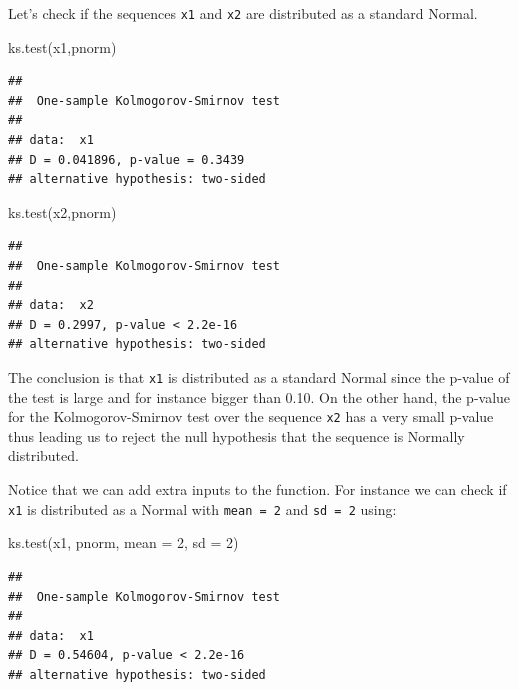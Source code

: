\documentclass[
]{book}
\newenvironment{Shaded}{\begin{snugshade}}{\end{snugshade}}
\newcommand{\AttributeTok}[1]{\textcolor[rgb]{0.77,0.63,0.00}{#1}}
\newcommand{\DecValTok}[1]{\textcolor[rgb]{0.00,0.00,0.81}{#1}}
\newcommand{\FunctionTok}[1]{\textcolor[rgb]{0.00,0.00,0.00}{#1}}
\newcommand{\NormalTok}[1]{#1}
\theoremstyle{definition}
\theoremstyle{definition}
\theoremstyle{definition}
\theoremstyle{definition}
\theoremstyle{remark}
\begin{document}
Let's check if the sequences \texttt{x1} and \texttt{x2} are distributed as a standard Normal.

\begin{Shaded}
\begin{Highlighting}[]
\FunctionTok{ks.test}\NormalTok{(x1,pnorm)}
\end{Highlighting}
\end{Shaded}

\begin{verbatim}
## 
##  One-sample Kolmogorov-Smirnov test
## 
## data:  x1
## D = 0.041896, p-value = 0.3439
## alternative hypothesis: two-sided
\end{verbatim}

\begin{Shaded}
\begin{Highlighting}[]
\FunctionTok{ks.test}\NormalTok{(x2,pnorm)}
\end{Highlighting}
\end{Shaded}

\begin{verbatim}
## 
##  One-sample Kolmogorov-Smirnov test
## 
## data:  x2
## D = 0.2997, p-value < 2.2e-16
## alternative hypothesis: two-sided
\end{verbatim}

The conclusion is that \texttt{x1} is distributed as a standard Normal since the p-value of the test is large and for instance bigger than 0.10. On the other hand, the p-value for the Kolmogorov-Smirnov test over the sequence \texttt{x2} has a very small p-value thus leading us to reject the null hypothesis that the sequence is Normally distributed.

Notice that we can add extra inputs to the function. For instance we can check if \texttt{x1} is distributed as a Normal with \texttt{mean\ =\ 2} and \texttt{sd\ =\ 2} using:

\begin{Shaded}
\begin{Highlighting}[]
\FunctionTok{ks.test}\NormalTok{(x1, pnorm, }\AttributeTok{mean =} \DecValTok{2}\NormalTok{, }\AttributeTok{sd =} \DecValTok{2}\NormalTok{)}
\end{Highlighting}
\end{Shaded}

\begin{verbatim}
## 
##  One-sample Kolmogorov-Smirnov test
## 
## data:  x1
## D = 0.54604, p-value < 2.2e-16
## alternative hypothesis: two-sided
\end{verbatim}
\end{document}
